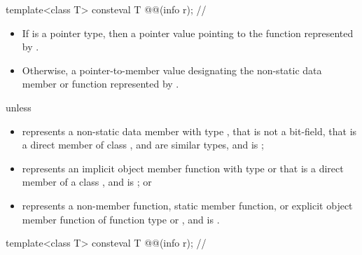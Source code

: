 \begin{itemdecl}
template<class T>
  consteval T @@(info r);       // \expos
\end{itemdecl}

\begin{itemdescr}
\pnum
\returns
\begin{itemize}
\item
  If  is a pointer type,
  then a pointer value pointing to the function represented by .
\item
  Otherwise, a pointer-to-member value
  designating the non-static data member or function represented by .
\end{itemize}

\pnum
\throws
{} unless
\begin{itemize}
\item
   represents a non-static data member with type ,
  that is not a bit-field,
  that is a direct member of class ,
   and  are similar types, and
   is ;
\item
   represents an implicit object member function
  with type  or 
  that is a direct member of a class ,
  and  is ; or
\item
   represents a non-member function,
  static member function, or
  explicit object member function
  of function type  or ,
  and  is .
\end{itemize}
\end{itemdescr}

\begin{itemdecl}
template<class T>
  consteval T @@(info r);    // \expos
\end{itemdecl}


